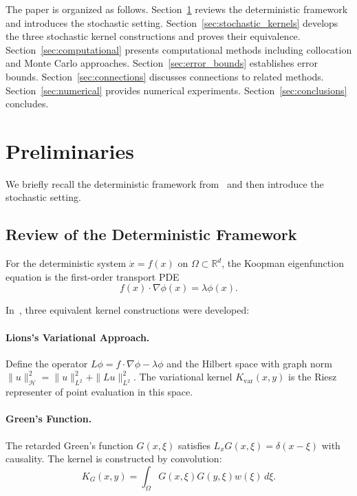 \documentclass[11pt,a4paper]{article}
\newcommand{\R}{\mathbb{R}}
\newcommand{\norm}[1]{\| #1 \|}
\begin{document}
The paper is organized as follows. Section~\ref{sec:preliminaries} reviews the deterministic framework and introduces the stochastic setting. Section~\ref{sec:stochastic_kernels} develops the three stochastic kernel constructions and proves their equivalence. Section~\ref{sec:computational} presents computational methods including collocation and Monte Carlo approaches. Section~\ref{sec:error_bounds} establishes error bounds. Section~\ref{sec:connections} discusses connections to related methods. Section~\ref{sec:numerical} provides numerical experiments. Section~\ref{sec:conclusions} concludes.

\section{Preliminaries}\label{sec:preliminaries}

We briefly recall the deterministic framework from~\cite{HamziOwhadiVaidya2024} and then introduce the stochastic setting.

\subsection{Review of the Deterministic Framework}

For the deterministic system $\dot{x} = f(x)$ on $\Omega \subset \R^d$, the Koopman eigenfunction equation is the first-order transport PDE
\begin{equation}\label{eq:det_transport}
f(x) \cdot \nabla \phi(x) = \lambda \phi(x).
\end{equation}

In~\cite{HamziOwhadiVaidya2024}, three equivalent kernel constructions were developed:

\paragraph{Lions's Variational Approach.} Define the operator $L\phi = f \cdot \nabla \phi - \lambda \phi$ and the Hilbert space with graph norm $\norm{u}_\mathcal{H}^2 = \norm{u}_{L^2}^2 + \norm{Lu}_{L^2}^2$. The variational kernel $K_{\mathrm{var}}(x,y)$ is the Riesz representer of point evaluation in this space.

\paragraph{Green's Function.} The retarded Green's function $G(x,\xi)$ satisfies $L_x G(x,\xi) = \delta(x-\xi)$ with causality. The kernel is constructed by convolution:
\begin{equation}
K_G(x,y) = \int_\Omega G(x,\xi) G(y,\xi) w(\xi) \, d\xi.
\end{equation}
\end{document}

